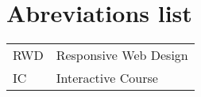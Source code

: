 \chapter*{Abreviations list}
\lhead{}

\begin{tabular}{ll}
RWD & Responsive Web Design \\
IC  & Interactive Course \\
\end{tabular}